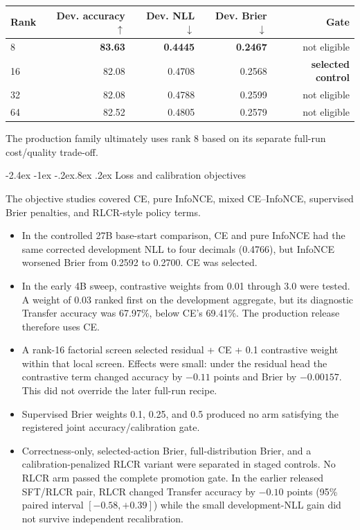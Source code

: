 \documentclass[10pt]{article}
\makeatletter
\renewcommand\subsection{\@startsection{subsection}{2}{\z@}%
  {-2.4ex \@plus -1ex \@minus -.2ex}{.8ex \@plus .2ex}%
  {\color{blue}\large\bfseries}}
\newcommand{\good}[1]{\textcolor{mint!60!black}{\textbf{#1}}}
\makeatother
\begin{document}
\begin{tabular}{p{.20\linewidth}rrrr}
\toprule
Rank & Dev. accuracy $\uparrow$ & Dev. NLL $\downarrow$ & Dev. Brier $\downarrow$ & Gate \\
\midrule
8  & \good{83.63} & \good{0.4445} & \good{0.2467} & not eligible \\
16 & 82.08 & 0.4708 & 0.2568 & \good{selected control} \\
32 & 82.08 & 0.4788 & 0.2599 & not eligible \\
64 & 82.52 & 0.4805 & 0.2579 & not eligible \\
\bottomrule
\end{tabular}

The production family ultimately uses rank 8 based on its separate full-run
cost/quality trade-off.

\subsection{Loss and calibration objectives}

The objective studies covered CE, pure InfoNCE, mixed CE--InfoNCE, supervised
Brier penalties, and RLCR-style policy terms.

\begin{itemize}
  \item In the controlled 27B base-start comparison, CE and pure InfoNCE had the
  same corrected development NLL to four decimals (0.4766), but InfoNCE worsened
  Brier from 0.2592 to 0.2700. CE was selected.
  \item In the early 4B sweep, contrastive weights from 0.01 through 3.0 were
  tested. A weight of 0.03 ranked first on the development aggregate, but its
  diagnostic Transfer accuracy was 67.97\%, below CE's 69.41\%. The production
  release therefore uses CE.
  \item A rank-16 factorial screen selected residual + CE + 0.1 contrastive weight
  within that local screen. Effects were small: under the residual head the
  contrastive term changed accuracy by $-0.11$ points and Brier by $-0.00157$.
  This did not override the later full-run recipe.
  \item Supervised Brier weights 0.1, 0.25, and 0.5 produced no arm satisfying the
  registered joint accuracy/calibration gate.
  \item Correctness-only, selected-action Brier, full-distribution Brier, and a
  calibration-penalized RLCR variant were separated in staged controls. No RLCR
  arm passed the complete promotion gate. In the earlier released SFT/RLCR pair,
  RLCR changed Transfer accuracy by $-0.10$ points (95\% paired interval
  $[-0.58,+0.39]$) while the small development-NLL gain did not survive
  independent recalibration.
\end{itemize}
\end{document}
